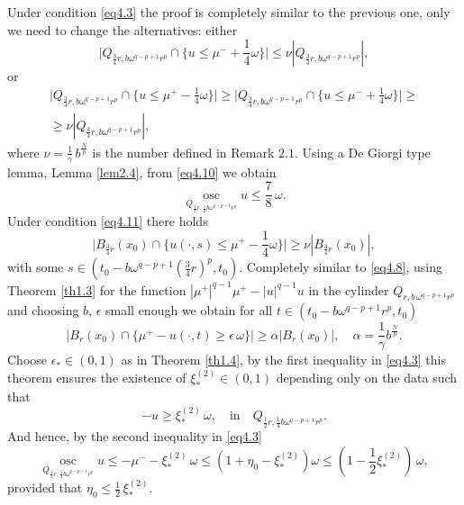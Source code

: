 \documentclass[a4paper,11pt,fullpage]{article}
\DeclareMathOperator*{\osc}{osc}
\numberwithin{equation}{section}
\begin{document}
Under condition \eqref{eq4.3} the proof  is completely similar to the previous one, only we need to change the alternatives: either
\begin{equation}\label{eq4.10}
\big|Q_{\frac{3}{4} r, b\omega^{q-p+1} r^p}\cap\big\{u\leqslant \mu^-+\frac{1}{4}\omega\big\}\big|\leqslant \nu|Q_{\frac{3}{4}r, b\omega^{q-p+1}r^p}|,
\end{equation}
or
\begin{multline}\label{eq4.11}
\big|Q_{\frac{3}{4} r, b\omega^{q-p+1} r^p}\cap\big\{u\leqslant \mu^+-\frac{1}{4}\omega\big\}\big|\geqslant \big|Q_{\frac{3}{4} r, b\omega^{q-p+1} r^p}\cap\big\{u\leqslant \mu^-+\frac{1}{4}\omega\big\}\big|\geqslant\\\geqslant \nu|Q_{\frac{3}{4}r, b\omega^{q-p+1}r^p}|,
\end{multline}
where  $\nu=\frac{1}{\gamma}\,b^{\frac{N}{p}}$ is the number defined in Remark $2.1$.
Using a De Giorgi type lemma, Lemma \ref{lem2.4}, from \eqref{eq4.10} we obtain
\begin{equation}\label{eq4.12}
\osc\limits_{Q_{\frac{1}{2} r, \frac{1}{2} b\omega^{q-p+1}r^p}} u\leqslant \frac{7}{8}\,\omega.
\end{equation}
Under condition \eqref{eq4.11} there holds 
$$\big|B_{\frac{3}{4} r}(x_0)\cap\big\{u(\cdot, s)\leqslant \mu^+-\frac{1}{4} \omega\big\}\big|\geqslant \nu |B_{\frac{3}{4} r}(x_0)|,$$
with some $s \in (t_0-b\omega^{q-p+1}(\frac{3}{4} r)^p, t_0).$ Completely similar to \eqref{eq4.8}, using Theorem \ref{th1.3} for the function
$|\mu^+|^{q-1}\mu^+-|u|^{q-1}u$ in the cylinder $Q_{r, b\,\omega^{q-p+1} r^p}$ and choosing $b$, $\epsilon$ small enough we obtain for all $t\in (t_0-b\omega^{q-p+1} r^p, t_0)$
\begin{equation}\label{eq4.13}
\big|B_r(x_0)\cap\big\{\mu^+-u(\cdot, t)\geqslant \epsilon\,\omega\big\}\big|\geqslant \alpha |B_r(x_0)|,\quad \alpha=\frac{1}{\gamma} b^{\frac{N}{p}}.
\end{equation}
Choose $\epsilon_*\in (0, 1)$ as in Theorem \ref{th1.4}, by the first inequality in \eqref{eq4.3} this theorem ensures the existence
of $\xi^{(2)}_*\in (0, 1)$ depending only on the data such that
$$-u \geqslant \xi^{(2)}_*\,\omega,\quad \text{in}\quad Q_{\frac{1}{2} r, \frac{1}{4} b \omega^{q-p+1} r^p}.$$
And hence, by the second inequality in \eqref{eq4.3}
\begin{equation}\label{eq4.14}
\osc\limits_{Q_{\frac{1}{2} r, \frac{1}{4} b \omega^{q-p+1} r^p}} u \leqslant -\mu^--\xi^{(2)}_*\,\omega\leqslant (1+\eta_0-\xi^{(2)}_*)\omega \leqslant (1-\frac{1}{2}\xi^{(2)}_*)\,\omega,
\end{equation}
provided that $\eta_0\leqslant \frac{1}{2}\,\xi^{(2)}_*.$
\end{document}

